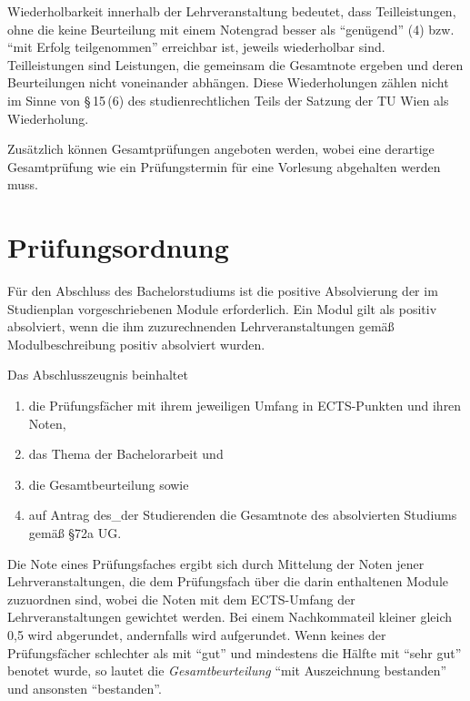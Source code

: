 Wiederholbarkeit innerhalb der Lehrveranstaltung bedeutet, dass
Teilleistungen, ohne die keine Beurteilung mit einem Notengrad besser
als "`genügend"' (4) bzw. "`mit Erfolg teilgenommen"' erreichbar ist,
jeweils wiederholbar sind. Teilleistungen sind Leistungen, die
gemeinsam die Gesamtnote ergeben und deren Beurteilungen nicht
voneinander abhängen. Diese Wiederholungen zählen nicht im Sinne von
§\,15\,(6) des studienrechtlichen Teils der Satzung der TU Wien als
Wiederholung.

Zusätzlich können Gesamtprüfungen angeboten werden, wobei eine
derartige Gesamtprüfung wie ein Prüfungstermin für eine Vorlesung
abgehalten werden muss.


\section{Prüfungsordnung}\label{sec:PO}

Für den Abschluss des Bachelorstudiums ist die positive Absolvierung
der im Studienplan vorgeschriebenen Module erforderlich. Ein Modul
gilt als positiv absolviert, wenn die ihm zuzurechnenden
Lehrveranstaltungen gemäß Modulbeschreibung positiv absolviert wurden.
%

Das Abschlusszeugnis beinhaltet
\begin{enumerate}[label=(\alph*)]
\item die Prüfungsfächer mit ihrem jeweiligen Umfang in ECTS-Punkten
  und ihren Noten,
%
\item das Thema der Bachelorarbeit und
\item die Gesamtbeurteilung sowie
\item auf Antrag des\_der Studierenden die Gesamtnote des absolvierten
Studiums gemäß §72a UG.
\end{enumerate}

Die Note eines Prüfungsfaches ergibt sich durch Mittelung der Noten
jener Lehrveranstaltungen, die dem Prüfungsfach über die darin
enthaltenen Module zuzuordnen sind, wobei die Noten mit dem
ECTS-Umfang der Lehrveranstaltungen gewichtet werden. Bei einem
Nachkommateil kleiner gleich 0,5 wird abgerundet, andernfalls
wird aufgerundet. Wenn keines der Prüfungsfächer schlechter als mit
"`gut"' und mindestens die Hälfte mit "`sehr gut"' benotet wurde, so
lautet die \emph{Gesamtbeurteilung} "`mit Auszeichnung bestanden"'
und ansonsten "`bestanden"'.

